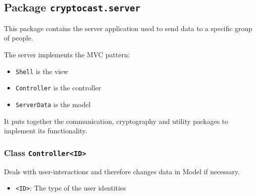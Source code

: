 \subsection{Package \lstinline!cryptocast.server!}
This package contains the server application used to send data to a specific group of people.

 The server implements the MVC pattern:
 \begin{itemize}
 \item \lstinline|Shell| is the view
 \item \lstinline|Controller| is the controller
 \item \lstinline|ServerData| is the model
 \end{itemize}

 It puts together the communication, cryptography and utility packages to implement its functionality.
\subsubsection{Class \lstinline|Controller<ID>|}
Deals with user-interactions and therefore changes data in Model if necessary. \\
\noindent\begin{minipage}[t]{5cm}
\vspace{0.3em}
\hspace*{2em}
\vspace{0.3em}
\end{minipage}

\begin{itemize}
\item \lstinline|<ID>|: The type of the user identities
\end{itemize}



